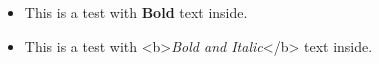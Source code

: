 \documentclass[12pt]{article}
\begin{document}
\begin{itemize}
	\item This is a test with \textbf{Bold} text inside.

	\item This is a test with <b>\textit{Bold and Italic}</b> text inside.

\end{itemize}
\end{document}
